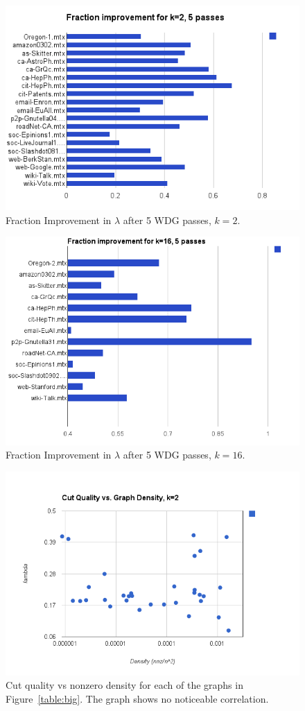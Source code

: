 \begin{figure}[h!]
\centering
\includegraphics[width=0.8\columnwidth] {figures/2partfrac}
\caption[Caption for]{Fraction Improvement in $\lambda$ after 5 WDG passes, $k=2$.}
\label{fig:03}
\end{figure}

\begin{figure}[h!]
\centering
\includegraphics[width=0.8\columnwidth] {figures/16partfrac}
\caption[Caption for]{Fraction Improvement in $\lambda$ after 5 WDG passes, $k=16$.}
\label{fig:04}
\end{figure}

\begin{figure}[h!]
\centering
\includegraphics[width=0.8\columnwidth] {figures/cutvsdens}
\caption[Caption for]{Cut quality vs nonzero density for each of the graphs in Figure~\ref{table:big}. The graph shows no noticeable correlation.}
\end{figure}


